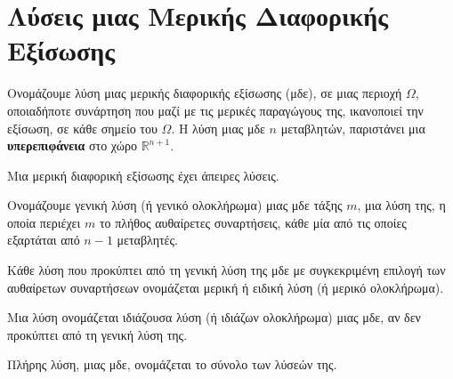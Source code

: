 \section*{Λύσεις μιας Μερικής Διαφορικής Εξίσωσης}

\begin{mybox1}
  \begin{dfn}
    Ονομάζουμε \textcolor{Col1}{λύση} μιας μερικής διαφορικής εξίσωσης (μδε), σε μιας 
    περιοχή $ \Omega $, οποιαδήποτε συνάρτηση που μαζί με τις μερικές παραγώγους της, 
    ικανοποιεί την εξίσωση, σε κάθε σημείο του $ \Omega $.
    Η λύση μιας μδε $n$ μεταβλητών, παριστάνει μια \textbf{υπερεπιφάνεια} στο χώρο 
    $ \mathbb{R}^{n+1} $.
  \end{dfn}
\end{mybox1}

\begin{rem}
  Μια μερική διαφορική εξίσωσης έχει άπειρες λύσεις.
\end{rem}

\begin{mybox1}
  \begin{dfn}
    Ονομάζουμε \textcolor{Col1}{γενική λύση (ή γενικό ολοκλήρωμα)} μιας μδε τάξης $m$, 
    μια λύση της, η οποία περιέχει $m$ το πλήθος αυθαίρετες συναρτήσεις, κάθε μία από 
    τις οποίες εξαρτάται από $ n-1 $ μεταβλητές.
  \end{dfn}
\end{mybox1}

\begin{mybox1}
  \begin{dfn}
    Κάθε λύση που προκύπτει από τη γενική λύση της μδε με συγκεκριμένη επιλογή των 
    αυθαίρετων συναρτήσεων ονομάζεται \textcolor{Col1}{μερική ή ειδική λύση (ή μερικό
    ολοκλήρωμα)}.
  \end{dfn}
\end{mybox1}

\begin{mybox1}
  \begin{dfn}
    Μια λύση ονομάζεται \textcolor{Col1}{ιδιάζουσα λύση (ή ιδιάζων ολοκλήρωμα)} μιας 
    μδε, αν δεν προκύπτει από τη γενική λύση της.
  \end{dfn}
\end{mybox1}

\begin{mybox1}
  \begin{dfn}
    Πλήρης λύση, μιας μδε, ονομάζεται το σύνολο των λύσεών της.
  \end{dfn}
\end{mybox1}

